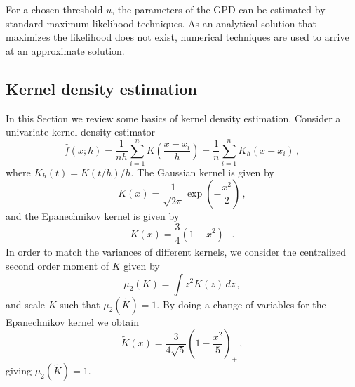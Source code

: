 \documentclass[letter,12pt]{article}
\begin{document}
For a chosen threshold $u$, the parameters of the GPD can be estimated by standard maximum likelihood techniques. As an analytical solution that maximizes the likelihood does not exist, numerical techniques are used to arrive at an approximate solution. 

\subsection{Kernel density estimation}\label{subsec:kde}
In this Section we review some basics of kernel density estimation. Consider a univariate kernel density estimator 
\begin{equation}\label{eq:kde1}
\hat{f}(x;h) = \frac{1}{nh}\sum_{i=1}^n K\left(\frac{x-x_i}{h}\right) = \frac{1}{n} \sum_{i=1}^n K_h(x-x_i)\, , 
\end{equation}
where $K_h(t) = K(t/h)/h$. The Gaussian kernel is given by
\begin{equation}\label{eq:kde2}
    K(x) = \frac{1}{\sqrt{2\pi }}{\exp\left(-\frac{x^2}{2}\right)} \, , 
\end{equation}
and the Epanechnikov kernel is given by
\begin{equation}\label{eq:kde3}
    K(x) = \frac{3}{4}\left(1 - x^2 \right)_+ \, .
\end{equation}
In order to match the variances of different kernels, we consider the centralized second order moment of $K$  given by
\begin{equation}\label{eq:kde4}
 \mu_2(K) = \int z^2 K(z) \, dz \, , 
\end{equation}
and scale $K$ such that $\mu_2(\tilde{K}) = 1$. By doing a change of variables for the Epanechnikov kernel we obtain
\begin{equation}\label{eq:kde5}
    \tilde{K}(x) = \frac{3}{4 \sqrt{5}}\left(1 - \frac{x^2}{5} \right)_+ \, ,
\end{equation}
giving $\mu_2(\tilde{K}) = 1$. 
\end{document}
